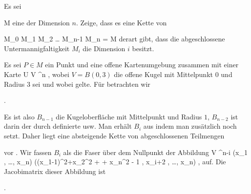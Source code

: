 {

Es sei

\mavergleichskette
{\vergleichskette
{ M
}
{ \neq }{ \emptyset
}
{  }{
}
{    }{
}
{   }{
}
}
{}{}{}
eine
der Dimension $n$. Zeige, dass es eine Kette von

\mavergleichskettedisp
{\vergleichskette
{ M_0
}
{ \subseteq} { M_1
}
{ \subseteq} { M_2
}
{ \subseteq  \ldots \subseteq} { M_{n-1}
}
{ \subseteq} { M_n
}
}
{
\vergleichskettefortsetzung
{ =} { M
}
{ } {}
{ } {}
{ } {}
}{}{}
derart gibt, dass die abgeschlossene Untermannigfaltigkeit $M_i$ die Dimension $i$ besitzt.

}
{

Es sei $P \in M$ ein Punkt und
 eine offene Kartenumgebung zusammen mit einer Karte
\maabbdisp {\alpha} { U } {V \subseteq \R^n
} {,}
wobei $V=B(0,3)$ die offene Kugel mit Mittelpunkt $0$ und Radius $3$ sei und wobei
 gelte. Für
  betrachten wir

 { . }

Es ist also $B_{n-1}$ die Kugeloberfläche mit Mittelpunkt
 und Radius $1$, $B_{n-2}$ ist darin der durch
 definierte  usw. Man erhält $B_i$ aus
 indem man zusätzlich noch
 setzt. Daher liegt eine absteigende Kette von abgeschlossenen Teilmengen

 {  }
 vor
 {} {.}
Wir fassen $B_i$ als die Faser über dem Nullpunkt der Abbildung
 { V } {\R^{n-i}
} {(x_1 , \ldots , x_n) } {  ((x_1-1)^2+x_2^2 + \cdots + x_n^2 - 1 , x_{i+2} , \ldots , x_n)
} {,}
auf. Die Jacobimatrix dieser Abbildung ist

 { . }

}
